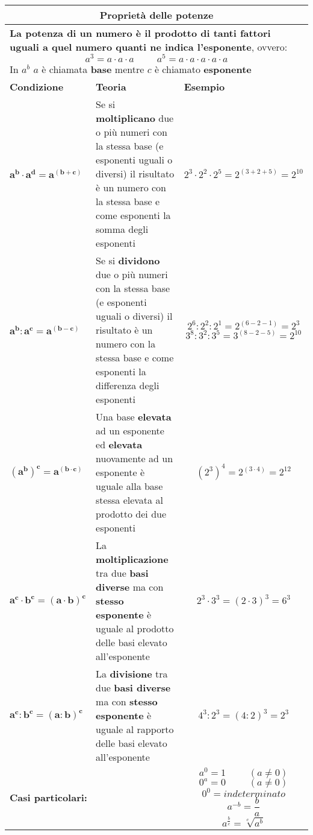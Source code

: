 \documentclass[14pt]{extarticle}
\begin{document}
\begin{table}
    \begin{tabular}{|m{0.2\linewidth}|m{0.4\linewidth}|m{0.4\linewidth}|}
        \hline
        \multicolumn{3}{|c|}{\large{\textbf{Proprietà delle potenze}}}\\
        \hline
        \multicolumn{3}{|p{0.9\textwidth}|}{\textbf{La potenza di un numero è il prodotto di tanti fattori uguali a quel numero quanti ne indica l'esponente}, ovvero: \[a^3=a\cdot a\cdot a \hspace{1cm} a^5=a\cdot a\cdot a \cdot a\cdot a\]In \(a^b\) \(a\) è chiamata \textbf{base} mentre \(c\) è chiamato \textbf{esponente}}\\
        \hline
        \hline
        \textbf{Condizione} & \textbf{Teoria} & \textbf{Esempio }\\
        \hline
        \(\mathbf{a^b\cdot a^d= a^{(b+c)}}\)& Se si \textbf{moltiplicano} due o più numeri con la stessa base (e esponenti uguali o diversi) il risultato è un numero con la stessa base e come esponenti la somma degli esponenti & \[2^3\cdot2^2\cdot2^5=2^{(3+2+5)}=2^{10}\]\\
        \hline
        \vspace{2mm}
        \(\mathbf{a^b:a^c= a^{(b-c)}}\)& Se si \textbf{dividono} due o più numeri con la stessa base (e esponenti uguali o diversi) il risultato è un numero con la stessa base e come esponenti la differenza degli esponenti & \[2^6:2^2:2^1=2^{(6-2-1)}=2^{3}  \]  \[3^8:3^2:3^5=3^{(8-2-5)}=2^{10} \]\\
        \hline
        \(\mathbf{(a^b)^c=a^{(b\cdot c)}} \) & Una base \textbf{elevata} ad un esponente ed \textbf{elevata} nuovamente ad un esponente è uguale alla base stessa elevata al prodotto dei due esponenti & \[(2^3)^4=2^{(3\cdot 4)}=2^{12}\] \\  
        \hline
        \(\mathbf{a^c\cdot b^c=(a\cdot b)^c}\) & La \textbf{moltiplicazione} tra due \textbf{basi diverse} ma con \textbf{stesso esponente} è uguale al prodotto delle basi elevato all'esponente & \[2^3\cdot 3^3=(2\cdot 3)^3=6^3\]\\ \hline
        \(\mathbf{a^c: b^c=(a: b)^c}\) & La \textbf{divisione} tra due \textbf{basi diverse} ma con \textbf{stesso esponente} è uguale al rapporto delle basi elevato all'esponente & \[4^3:2^3=(4:2)^3=2^3\]\\ 
        \hline
        \multicolumn{2}{|p{0.3\textwidth}|}{\textbf{Casi particolari:}}& \[a^0=1\hspace{1cm} (a\neq0)\] \[0^a=0\hspace{1cm}  (a\neq0)\] \[0^0=indeterminato\]\[a^{-b}=\frac{b}{a}\] \[a^{\frac{b}{c}}=\sqrt[c]{a^b}\]\\
        \hline
         \end{tabular}
\end{table}
\clearpage
\end{document}
